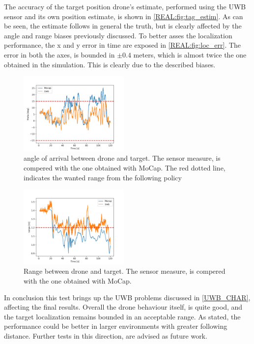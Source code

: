 The accuracy of the target position drone's estimate, performed using the UWB sensor and its own position estimate, is shown in \autoref{REAL:fig:tag_estim}. As can be seen, the estimate follows in general the truth, but is clearly affected by the angle and range biases previously discussed. To better asses the localization performance, the x and y error in time are exposed in \autoref{REAL:fig:loc_err}. The error in both the axes, is bounded in $\pm 0.4$ meters, which is almost twice the one obtained in the simulation. This is clearly due to the described biases.\\

\begin{figure}
    \centering
    \includegraphics[width=0.48\textwidth]{images/real_test/aoa_Uwb_Mocap.png}
    \caption{angle of arrival between drone and target. The sensor measure, is compered with the one obtained with MoCap. The red dotted line, indicates the wanted range from the following policy}
    \label{REAL:fig:aoa}
\end{figure}

\begin{figure}
    \centering
    \includegraphics[width=0.48\textwidth]{images/real_test/range_Uwb_Mocap.png}
    \caption{Range between drone and target. The sensor measure, is compered with the one obtained with MoCap.}
    \label{REAL:fig:range}
\end{figure}

In conclusion this test brings up the UWB problems discussed in \autoref{UWB_CHAR}, affecting the final results. Overall the drone behaviour itself, is quite good, and the target localization remains bounded in an acceptable range. As stated, the performance could be better in larger environments with greater following distance. Further tests in this direction, are advised as future work.

